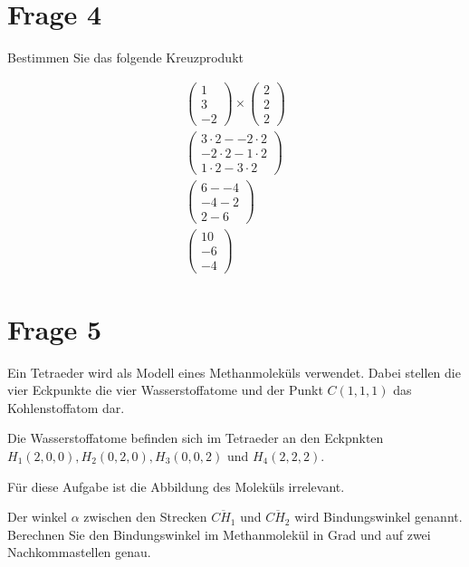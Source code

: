 \section{Frage 4}

Bestimmen Sie das folgende Kreuzprodukt

\begin{align*}
    \begin{pmatrix}
        1 \\ 3 \\ -2
    \end{pmatrix} \times \begin{pmatrix}
        2 \\ 2 \\ 2
    \end{pmatrix} \\
    \begin{pmatrix}
        3 \cdot 2 - -2 \cdot 2 \\
        -2  \cdot 2 - 1 \cdot 2 \\
        1 \cdot 2 - 3 \cdot 2
    \end{pmatrix} \\
    \begin{pmatrix}
        6 - -4 \\
        -4 - 2 \\
        2 - 6
    \end{pmatrix} \\
    \begin{pmatrix}
        10 \\ -6 \\ -4
    \end{pmatrix}
\end{align*}

\section{Frage 5}

Ein Tetraeder wird als Modell eines Methanmoleküls verwendet. Dabei stellen die vier Eckpunkte die vier Wasserstoffatome und der Punkt $C(1,1,1)$ das Kohlenstoffatom dar.

Die Wasserstoffatome befinden sich im Tetraeder an den Eckpnkten $H_1(2,0,0), H_2(0,2,0), H_3(0,0,2)$ und $H_4(2,2,2)$.

Für diese Aufgabe ist die Abbildung des Moleküls irrelevant.

Der winkel $\alpha$ zwischen den Strecken $\overline{CH_1}$ und $\overline{CH_2}$ wird Bindungswinkel genannt. Berechnen Sie den Bindungswinkel im Methanmolekül in Grad und auf zwei Nachkommastellen genau.

